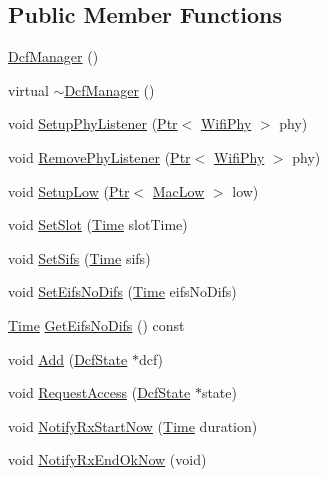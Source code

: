 \subsection*{Public Member Functions}
\begin{DoxyCompactItemize}
\item 
\hyperlink{classns3_1_1DcfManager_a3c29c92763917777c33adcb5fb48753f}{Dcf\+Manager} ()
\item 
virtual \hyperlink{classns3_1_1DcfManager_a5e21e09204cad30803e86cf3f7382269}{$\sim$\+Dcf\+Manager} ()
\item 
void \hyperlink{classns3_1_1DcfManager_aba35d453c3c37ce143a8a728be5034c9}{Setup\+Phy\+Listener} (\hyperlink{classns3_1_1Ptr}{Ptr}$<$ \hyperlink{classns3_1_1WifiPhy}{Wifi\+Phy} $>$ phy)
\item 
void \hyperlink{classns3_1_1DcfManager_a5cce232bcf7b8be9cf21d3405bf6f560}{Remove\+Phy\+Listener} (\hyperlink{classns3_1_1Ptr}{Ptr}$<$ \hyperlink{classns3_1_1WifiPhy}{Wifi\+Phy} $>$ phy)
\item 
void \hyperlink{classns3_1_1DcfManager_af744fc49f79b89475ae47004962bc989}{Setup\+Low} (\hyperlink{classns3_1_1Ptr}{Ptr}$<$ \hyperlink{classns3_1_1MacLow}{Mac\+Low} $>$ low)
\item 
void \hyperlink{classns3_1_1DcfManager_a9e0041c0547840e3c0eab18420b27af1}{Set\+Slot} (\hyperlink{classns3_1_1Time}{Time} slot\+Time)
\item 
void \hyperlink{classns3_1_1DcfManager_a185fe039ee2407d15dc2007cc43b722b}{Set\+Sifs} (\hyperlink{classns3_1_1Time}{Time} sifs)
\item 
void \hyperlink{classns3_1_1DcfManager_aa917bc57e6828c4060730c7c0cfb00e2}{Set\+Eifs\+No\+Difs} (\hyperlink{classns3_1_1Time}{Time} eifs\+No\+Difs)
\item 
\hyperlink{classns3_1_1Time}{Time} \hyperlink{classns3_1_1DcfManager_a7509546551b90149ffa089132f086a77}{Get\+Eifs\+No\+Difs} () const 
\item 
void \hyperlink{classns3_1_1DcfManager_a0b27b5152f4394f743555d4693fd7fef}{Add} (\hyperlink{classns3_1_1DcfState}{Dcf\+State} $\ast$dcf)
\item 
void \hyperlink{classns3_1_1DcfManager_a34f321cc7651b9bc9ac254af83521363}{Request\+Access} (\hyperlink{classns3_1_1DcfState}{Dcf\+State} $\ast$state)
\item 
void \hyperlink{classns3_1_1DcfManager_ae0b19d6de8e25bec57366eecc7ddcc07}{Notify\+Rx\+Start\+Now} (\hyperlink{classns3_1_1Time}{Time} duration)
\item 
void \hyperlink{classns3_1_1DcfManager_a5fbdfc1e006df42d8a7fa7a1b7b4bd3b}{Notify\+Rx\+End\+Ok\+Now} (void)

\end{DoxyCompactItemize}

